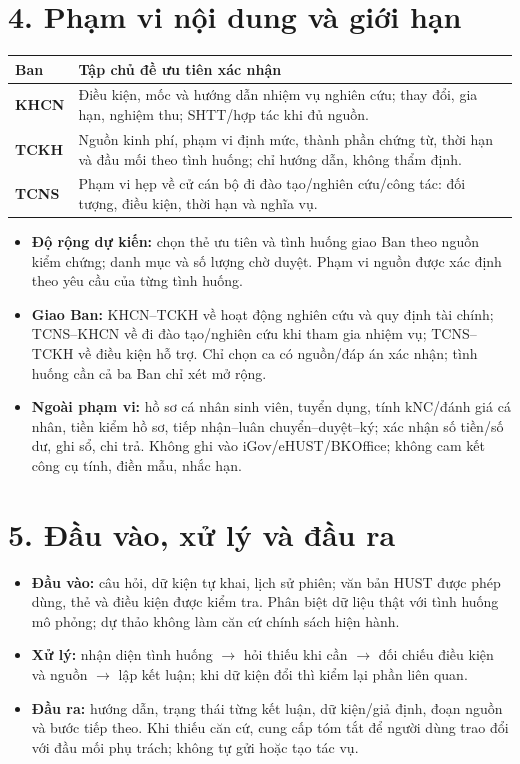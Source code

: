 \documentclass[12pt,a4paper]{article}
\begin{document}
\section*{4. Phạm vi nội dung và giới hạn}
\begin{tabularx}{\textwidth}{@{}>{\RaggedRight\arraybackslash}p{20mm}X@{}}
\toprule
\textbf{Ban} & \textbf{Tập chủ đề ưu tiên xác nhận}\\
\midrule
\textbf{KHCN} & Điều kiện, mốc và hướng dẫn nhiệm vụ nghiên cứu; thay đổi, gia hạn, nghiệm thu; SHTT/hợp tác khi đủ nguồn.\\
\textbf{TCKH} & Nguồn kinh phí, phạm vi định mức, thành phần chứng từ, thời hạn và đầu mối theo tình huống; chỉ hướng dẫn, không thẩm định.\\
\textbf{TCNS} & Phạm vi hẹp về cử cán bộ đi đào tạo/nghiên cứu/công tác: đối tượng, điều kiện, thời hạn và nghĩa vụ.\\
\bottomrule
\end{tabularx}
\begin{itemize}
\item \textbf{Độ rộng dự kiến:} chọn thẻ ưu tiên và tình huống giao Ban theo nguồn kiểm chứng; danh mục và số lượng chờ duyệt. Phạm vi nguồn được xác định theo yêu cầu của từng tình huống.
\item \textbf{Giao Ban:} KHCN--TCKH về hoạt động nghiên cứu và quy định tài chính; TCNS--KHCN về đi đào tạo/nghiên cứu khi tham gia nhiệm vụ; TCNS--TCKH về điều kiện hỗ trợ. Chỉ chọn ca có nguồn/đáp án xác nhận; tình huống cần cả ba Ban chỉ xét mở rộng.
\item \textbf{Ngoài phạm vi:} hồ sơ cá nhân sinh viên, tuyển dụng, tính kNC/đánh giá cá nhân, tiền kiểm hồ sơ, tiếp nhận--luân chuyển--duyệt--ký; xác nhận số tiền/số dư, ghi sổ, chi trả. Không ghi vào iGov/eHUST/BKOffice; không cam kết công cụ tính, điền mẫu, nhắc hạn.
\end{itemize}

\section*{5. Đầu vào, xử lý và đầu ra}
\begin{itemize}
\item \textbf{Đầu vào:} câu hỏi, dữ kiện tự khai, lịch sử phiên; văn bản HUST được phép dùng, thẻ và điều kiện được kiểm tra. Phân biệt dữ liệu thật với tình huống mô phỏng; dự thảo không làm căn cứ chính sách hiện hành.
\item \textbf{Xử lý:} nhận diện tình huống $\rightarrow$ hỏi thiếu khi cần $\rightarrow$ đối chiếu điều kiện và nguồn $\rightarrow$ lập kết luận; khi dữ kiện đổi thì kiểm lại phần liên quan.
\item \textbf{Đầu ra:} hướng dẫn, trạng thái từng kết luận, dữ kiện/giả định, đoạn nguồn và bước tiếp theo. Khi thiếu căn cứ, cung cấp tóm tắt để người dùng trao đổi với đầu mối phụ trách; không tự gửi hoặc tạo tác vụ.
\end{itemize}
\end{document}
